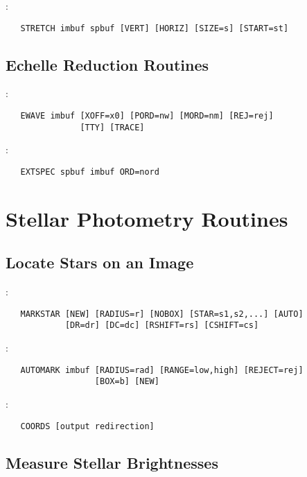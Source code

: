 \noindent {}:
\begin{verbatim}
   STRETCH imbuf spbuf [VERT] [HORIZ] [SIZE=s] [START=st]
\end{verbatim}

\subsection{Echelle Reduction Routines}

:
\begin{verbatim}
   EWAVE imbuf [XOFF=x0] [PORD=nw] [MORD=nm] [REJ=rej]
               [TTY] [TRACE]
\end{verbatim}

\noindent {}:
\begin{verbatim}
   EXTSPEC spbuf imbuf ORD=nord
\end{verbatim}


\section{Stellar Photometry Routines}

\subsection{Locate Stars on an Image}

:
\begin{verbatim}
   MARKSTAR [NEW] [RADIUS=r] [NOBOX] [STAR=s1,s2,...] [AUTO]
            [DR=dr] [DC=dc] [RSHIFT=rs] [CSHIFT=cs]
\end{verbatim}

\noindent {}:
\begin{verbatim}
   AUTOMARK imbuf [RADIUS=rad] [RANGE=low,high] [REJECT=rej]
                  [BOX=b] [NEW]
\end{verbatim}

\noindent {}:
\begin{verbatim}
   COORDS [output redirection]
\end{verbatim}

\subsection{Measure Stellar Brightnesses}

